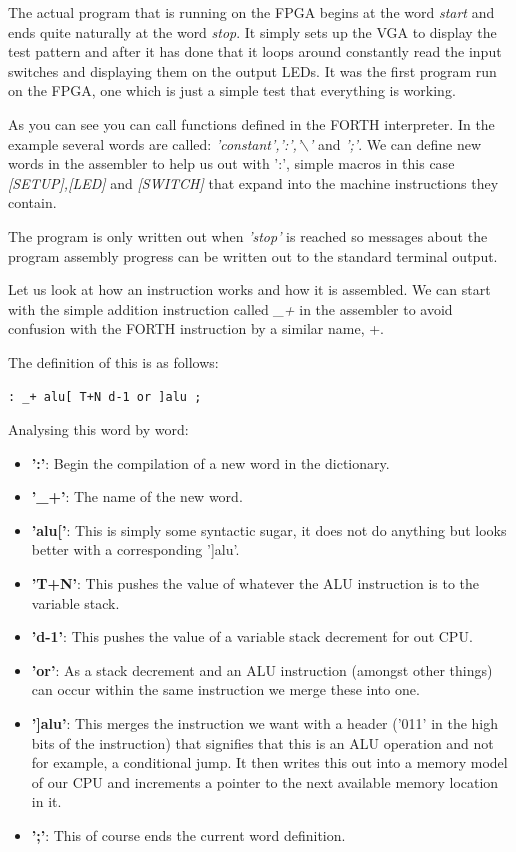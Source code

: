 \documentclass	[a4paper, 10pt]	{article}
\begin{document}
    The actual program that is running on the FPGA begins at the word \emph{start}
    and ends quite naturally at the word \emph{stop}. It simply sets up the VGA
    to display the test pattern and after it has done that it loops around
    constantly read the input switches and displaying them on the output LEDs. It
    was the first program run on the FPGA, one which is just a simple test that
    everything is working.

    As you can see you can call functions defined in the FORTH interpreter. In the
    example several words are called: \emph{'constant',':','$\backslash$'} and \emph{';'}. We can
    define new words in the assembler to help us out with ':', simple macros in
    this case \emph{[SETUP],[LED]} and \emph{[SWITCH]} that expand into the machine
    instructions they contain.

    The program is only written out when \emph{'stop'} is reached so messages
    about the program assembly progress can be written out to the standard terminal
    output.

    Let us look at how an instruction works and how it is assembled. We can start
    with the simple addition instruction called \emph{\_+} in the assembler to
    avoid confusion with the FORTH instruction by a similar name, +. 

    The definition of this is as follows:    

\begin{verbatim}
: _+ alu[ T+N d-1 or ]alu ;
\end{verbatim}

    Analysing this word by word:

    \begin{itemize}
      \item \textbf{':'}: Begin the compilation of a new word in the dictionary.
      \item \textbf{'\_+'}: The name of the new word.
      \item \textbf{'alu['}: This is simply some syntactic sugar, it does not
      do anything but looks better with a corresponding ']alu'.
      \item \textbf{'T+N'}: This pushes the value of whatever the ALU instruction
      is to the variable stack.
      \item \textbf{'d-1'}: This pushes the value of a variable stack decrement
      for out CPU.
      \item \textbf{'or'}: As a stack decrement and an ALU instruction (amongst
      other things) can occur within the same instruction we merge these into
      one.
      \item \textbf{']alu'}: This merges the instruction we want with a header
      ('011' in the high bits of the instruction) that signifies that this is
      an ALU operation and not for example, a conditional jump. It then writes
      this out into a memory model of our CPU and increments a pointer to the
      next available memory location in it.
      \item \textbf{';'}: This of course ends the current word definition.
    \end{itemize}
\end{document}
